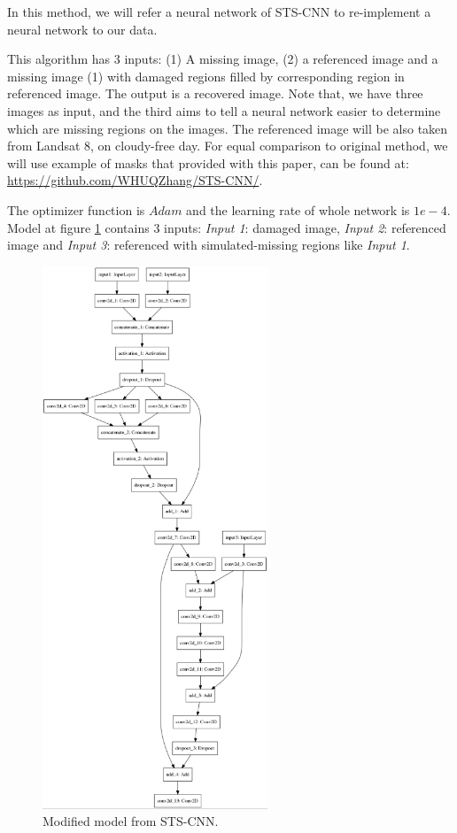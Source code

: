 In this method, we will refer a neural network of STS-CNN\cite{Zhang2018} to re-implement a neural network to our data. 

This algorithm has 3 inputs: (1) A missing image, (2) a referenced image and a missing image (1) with damaged regions filled by corresponding region in referenced image. The output is a recovered image. Note that, we have three images as input, and the third aims to tell a neural network easier to determine which are missing regions on the images. The referenced image will be also taken from Landsat 8, on cloudy-free day. For equal comparison to original method, we will use example of masks that provided with this paper, can be found at: \href{https://github.com/WHUQZhang/STS-CNN/}{https://github.com/WHUQZhang/STS-CNN/}.

The optimizer function is $Adam$ and the learning rate of whole network is $1e-4$. Model at figure \ref{fig:modifiedModel} contains 3 inputs: \textit{Input 1}: damaged image, \textit{Input 2}: referenced image and \textit{Input 3}: referenced with simulated-missing regions like \textit{Input 1}.

\begin{figure}[t]
	\centering
	\includegraphics[width=0.6\textwidth]{figures/modifiedModel.png}
	\caption{Modified model from STS-CNN.}
	\label{fig:modifiedModel}
\end{figure}	

